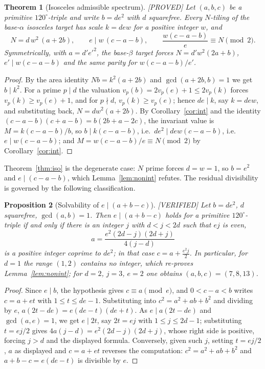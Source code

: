 \documentclass[11pt,reqno]{amsart}
\theoremstyle{plain}
\newtheorem{theorem}{Theorem}
\newtheorem{proposition}[theorem]{Proposition}
\theoremstyle{definition}
\newcommand{\lab}[1]{\hfill\textnormal{\footnotesize\textsc{[#1]}}}
\begin{document}
\begin{theorem}[Isosceles admissible spectrum]\label{thm:admissible}\lab{PROVED}
Let $(a,b,c)$ be a primitive $120^\circ$-triple and write $b=de^2$ with $d$ squarefree. Every
$N$-tiling of the base-$\alpha$ isosceles target has scale $k=dew$ for a positive integer $w$, and
\[
N=d\,w^2\,(a+2b),\qquad e\mid w\,(c-a-b),\qquad \frac{w(c-a-b)}{e}\equiv N\pmod 2 .
\]
Symmetrically, with $a=d'e'^2$, the base-$\beta$ target forces $N=d'w^2(2a+b)$,
$e'\mid w(c-a-b)$ and the same parity for $w(c-a-b)/e'$.
\end{theorem}

\begin{proof}
By the area identity $Nb=k^2(a+2b)$ and $\gcd(a+2b,b)=1$ we get $b\mid k^2$. For a prime
$p\mid d$ the valuation $v_p(b)=2v_p(e)+1\le 2v_p(k)$ forces $v_p(k)\ge v_p(e)+1$, and for
$p\nmid d$, $v_p(k)\ge v_p(e)$; hence $de\mid k$, say $k=dew$, and substituting back,
$N=dw^2(a+2b)$. By Corollary~\ref{cor:int} and the identity $(c-a-b)(c+a-b)=b(2b+a-2c)$, the
invariant value is $M=k(c-a-b)/b$, so $b\mid k(c-a-b)$, i.e.\ $de^2\mid dew(c-a-b)$, i.e.\
$e\mid w(c-a-b)$; and $M=w(c-a-b)/e\equiv N\pmod2$ by Corollary~\ref{cor:int}.
\end{proof}

\noindent Theorem~\ref{thm:iso} is the degenerate case: $N$ prime forces $d=w=1$, so $b=e^2$ and
$e\mid(c-a-b)$, which Lemma~\ref{lem:nonint} refutes. The residual divisibility is governed by the
following classification.

\begin{proposition}[Solvability of $e\mid(a+b-c)$]\label{prop:solv}\lab{VERIFIED}
Let $b=de^2$, $d$ squarefree, $\gcd(a,b)=1$. Then $e\mid(a+b-c)$ holds for a primitive
$120^\circ$-triple if and only if there is an integer $j$ with $d<j<2d$ such that $ej$ is even,
\[
a=\frac{e^2(2d-j)(2d+j)}{4(j-d)}
\]
is a positive integer coprime to $de^2$; in that case $c=a+\tfrac{e^2 j}{2}$. In particular, for
$d=1$ the range $(1,2)$ contains no integer, which re-proves Lemma~\ref{lem:nonint}; for $d=2$,
$j=3$, $e=2$ one obtains $(a,b,c)=(7,8,13)$.
\end{proposition}

\begin{proof}
Since $e\mid b$, the hypothesis gives $c\equiv a\pmod e$, and $0<c-a<b$ writes $c=a+et$ with
$1\le t\le de-1$. Substituting into $c^2=a^2+ab+b^2$ and dividing by $e$,
$a(2t-de)=e(de-t)(de+t)$. As $e\mid a(2t-de)$ and $\gcd(a,e)=1$, we get $e\mid 2t$, say $2t=ej$
with $1\le j\le 2d-1$; substituting $t=ej/2$ gives $4a(j-d)=e^2(2d-j)(2d+j)$, whose right side is
positive, forcing $j>d$ and the displayed formula. Conversely, given such $j$, setting
$t=ej/2$, $a$ as displayed and $c=a+et$ reverses the computation: $c^2=a^2+ab+b^2$ and
$a+b-c=e(de-t)$ is divisible by $e$.
\end{proof}
\end{document}
